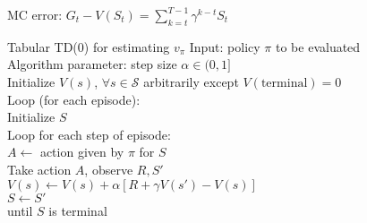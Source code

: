 \documentclass[twocolumn]{article}
\begin{document}
MC error: $G_t - V(S_t) = \sum_{k=t}^{T-1} \gamma^{k-t} S_t$

\begin{mydef}{Tabular TD(0) for estimating $v_\pi$}{}
    Input: policy $\pi$ to be evaluated \\
    Algorithm parameter: step size $\alpha \in (0, 1]$ \\
    Initialize $V(s)$, $\forall s \in \mathcal S$ arbitrarily except $V(\text{terminal}) = 0$ \\
    
        Loop (for each episode): \\
            \hspace*{2em}Initialize $S$ \\
            \hspace*{2em}Loop for each step of episode: \\
                \hspace*{4em}$A \leftarrow$ action given by $\pi$ for $S$ \\
                \hspace*{4em}Take action $A$, observe $R, S'$ \\
                \hspace*{4em}$V(s) \leftarrow V(s) + \alpha [R + \gamma V(s') - V(s)]$ \\
                \hspace*{4em}$S \leftarrow S'$ \\
            \hspace*{2em}until $S$ is terminal
\end{mydef}


\cleardoublepage
\end{document}
